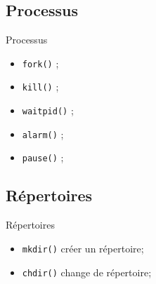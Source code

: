\begin{frame}{\sectitle}
\def\subsectitle{Processus}
\subsection{\subsectitle}

\begin{exampleblock}{\subsectitle}
\begin{itemize}
    \item \texttt{fork()} ;
    \item \texttt{kill()} ;
    \item \texttt{waitpid()} ;
    \item \texttt{alarm()} ;
    \item \texttt{pause()} ;
\end{itemize}
\end{exampleblock}

\def\subsectitle{Répertoires}
\subsection{\subsectitle}

\begin{exampleblock}{\subsectitle}
\begin{itemize}
    \item \texttt{mkdir()} créer un répertoire;
    \item \texttt{chdir()} change de répertoire;
\end{itemize}
\end{exampleblock}

\end{frame}


